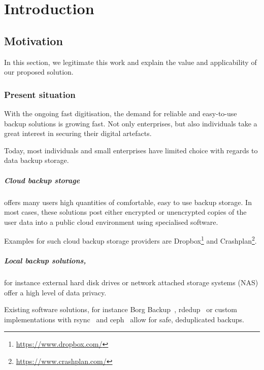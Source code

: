 \chapter{Introduction}
\label{sec:introduction}

\section{Motivation}
In this section, we legitimate this work and explain the value and applicability of our proposed solution.

\subsection{Present situation}
With the ongoing fast digitisation, the demand for reliable and easy-to-use backup solutions is growing fast. Not only enterprises, but also individuals take a great interest in securing their digital artefacts.

Today, most individuals and small enterprises have limited choice with regards to data backup storage.

\paragraph{Cloud backup storage} offers many users high quantities of comfortable, easy to use backup storage. In most cases, these solutions post either encrypted or unencrypted copies of the user data into a public cloud environment using specialised software.

Examples for such cloud backup storage providers are Dropbox\footnote{\url{https://www.dropbox.com/}} and Crashplan\footnote{\url{https://www.crashplan.com/}}.

\paragraph{Local backup solutions,} for instance external hard disk drives or network attached storage systems (NAS) offer a high level of data privacy. 

Existing software solutions, for instance Borg Backup~\cite{borg-backup}, rdedup~\cite{rdedup} or custom implementations with rsync~\cite{rsync} and ceph~\cite{ceph} allow for safe, deduplicated backups.

